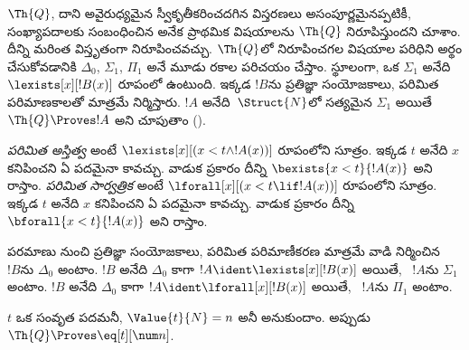 \documentclass[../../../include/open-logic-section]{subfiles}
\begin{document}

$\Th{Q}$, దాని అవైరుధ్యమైన స్వీకృతీకరించదగిన విస్తరణలు అసంపూర్ణమైనప్పటికీ,
సంఖ్యాపదాలకు సంబంధించిన అనేక ప్రాథమిక విషయాలను $\Th{Q}$ నిరూపిస్తుందని
చూశాం. దీన్ని మరింత విస్తృతంగా నిరూపించవచ్చు. $\Th{Q}$లో నిరూపించగల విషయాల
పరిధిని అర్థం చేసుకోవడానికి $\Delta_0$, $\Sigma_1$, $\Pi_1$ అనే మూడు రకాల
 పరిచయం చేస్తాం. స్థూలంగా, ఒక $\Sigma_1$  అనేది
$\lexists[x][!B(x)]$ రూపంలో ఉంటుంది. ఇక్కడ $!B$ను ప్రతిజ్ఞా సంయోజకాలు,
పరిమిత పరిమాణకాలతో మాత్రమే నిర్మిస్తారు. $!A$ అనేది~$\Struct{N}$లో సత్యమైన
$\Sigma_1$  అయితే $\Th{Q}\Proves !A$ అని చూపుతాం
().

\begin{defn}
\emph{పరిమిత అస్తిత్వ } అంటే
$\lexists[x][(x<t\land !A(x))]$ రూపంలోని సూత్రం. ఇక్కడ $t$ అనేది
$x$ కనిపించని ఏ పదమైనా కావచ్చు.
వాడుక ప్రకారం దీన్ని $\bexists{x<t}{!A(x)}$ అని రాస్తాం.
%
\emph{పరిమిత సార్వత్రిక } అంటే
$\lforall[x][(x<t\lif !A(x))]$ రూపంలోని సూత్రం. ఇక్కడ $t$ అనేది
$x$ కనిపించని ఏ పదమైనా కావచ్చు.
వాడుక ప్రకారం దీన్ని $\bforall{x<t}{!A(x)}$ అని రాస్తాం.
\end{defn}

\begin{defn}
పరమాణు  నుంచి ప్రతిజ్ఞా సంయోజకాలు, పరిమిత పరిమాణీకరణ మాత్రమే వాడి
నిర్మించిన ~$!B$ను $\Delta_0$ అంటాం.
%
$!B$ అనేది $\Delta_0$ కాగా $!A\ident\lexists[x][!B(x)]$ అయితే,
~$!A$ను $\Sigma_1$ అంటాం.
%
$!B$ అనేది $\Delta_0$ కాగా $!A\ident\lforall[x][!B(x)]$ అయితే,
~$!A$ను $\Pi_1$ అంటాం.
\end{defn}

\begin{lem}
 $t$ ఒక సంవృత పదమనీ,
$\Value{t}{N}=n$ అనీ అనుకుందాం. అప్పుడు $\Th{Q}\Proves\eq[t][\num n]$.
\end{lem}
\end{document}
